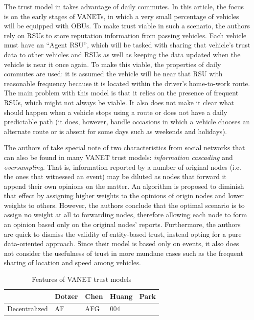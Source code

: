 The trust model in \cite{park2011long} takes advantage of daily commutes.
In this article, the focus is on the early stages of VANETs, in which a very small percentage of vehicles will be equipped with OBUs.
To make trust viable in such a scenario, the authors rely on RSUs to store reputation information from passing vehicles.
Each vehicle must have an ``Agent RSU'', which will be tasked with sharing that vehicle's trust data to other vehicles and RSUs as well as keeping the data updated when the vehicle is near it once again.
To make this viable, the properties of daily commutes are used: it is assumed the vehicle will be near that RSU with reasonable frequency because it is located within the driver's home-to-work route.
The main problem with this model is that it relies on the presence of frequent RSUs, which might not always be viable.
It also does not make it clear what should happen when a vehicle stops using a route or does not have a daily predictable path (it does, however, handle occasions in which a vehicle chooses an alternate route or is absent for some days such as weekends and holidays).

The authors of \cite{huang2014social} take special note of two characteristics from social networks that can also be found in many VANET trust models: \textit{information cascading} and \textit{oversampling}.
That is, information reported by a number of original nodes (i.e. the ones that witnessed an event) may be diluted as nodes that forward it append their own opinions on the matter.
An algorithm is proposed to diminish that effect by assigning higher weights to the opinions of origin nodes and lower weights  to others.
However, the authors conclude that the optimal scenario is to assign no weight at all to forwarding nodes, therefore allowing each node to form an opinion based only on the original nodes' reports.
Furthermore, the authors are quick to dismiss the validity of entity-based trust, instead opting for a pure data-oriented approach.
Since their model is based only on events, it also does not consider the usefulness of trust in more mundane cases such as the frequent sharing of location and speed among vehicles.

\begin{table}[h!]
\centering
\begin{tabular}{ |p{3cm}||p{1cm}|p{1cm}|p{1cm}|p{1cm}| }
 \hline
 & Dotzer & Chen & Huang & Park\\
 \hline
 Decentralized   & AF    &AFG&   004 &\\
 \hline
\end{tabular}
\caption{Features of VANET trust models}
\label{table:1}
\end{table}



